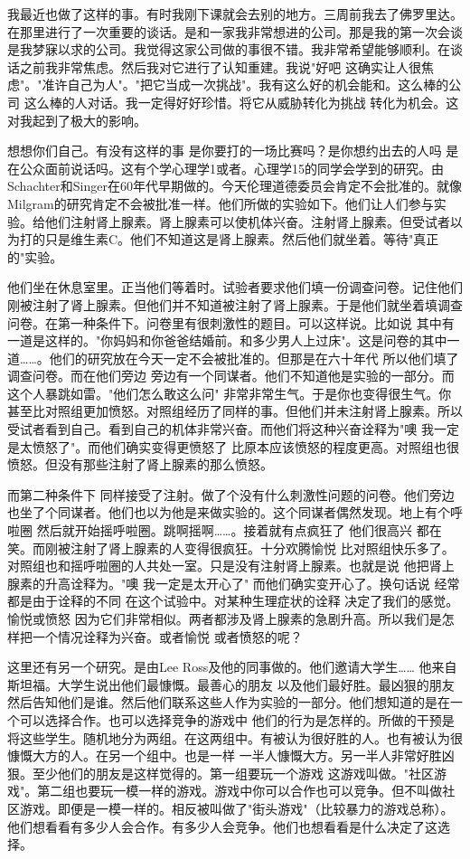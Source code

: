 我最近也做了这样的事。有时我刚下课就会去别的地方。三周前我去了佛罗里达。在那里进行了一次重要的谈话。是和一家我非常想进的公司。那是我的第一次会谈 是我梦寐以求的公司。我觉得这家公司做的事很不错。我非常希望能够顺利。在谈话之前我非常焦虑。然后我对它进行了认知重建。我说"好吧 这确实让人很焦虑"。"准许自己为人"。"把它当成一次挑战"。我有这么好的机会能和。这么棒的公司 这么棒的人对话。我一定得好好珍惜。将它从威胁转化为挑战 转化为机会。这对我起到了极大的影响。 

想想你们自己。有没有这样的事 是你要打的一场比赛吗？是你想约出去的人吗 是在公众面前说话吗。这有个学心理学1或者。心理学15的同学会学到的研究。由Schachter和Singer在60年代早期做的。今天伦理道德委员会肯定不会批准的。就像Milgram的研究肯定不会被批准一样。他们所做的实验如下。他们让人们参与实验。给他们注射肾上腺素。肾上腺素可以使机体兴奋。注射肾上腺素。但受试者以为打的只是维生素C。他们不知道这是肾上腺素。然后他们就坐着。等待"真正的"实验。 

他们坐在休息室里。正当他们等着时。试验者要求他们填一份调查问卷。记住他们刚被注射了肾上腺素。但他们并不知道被注射了肾上腺素。于是他们就坐着填调查问卷。在第一种条件下。问卷里有很刺激性的题目。可以这样说。比如说 其中有一道是这样的。"你妈妈和你爸爸结婚前。和多少男人上过床"。这是问卷的其中一道……。他们的研究放在今天一定不会被批准的。但那是在六十年代 所以他们填了调查问卷。而在他们旁边 旁边有一个同谋者。他们不知道他是实验的一部分。而这个人暴跳如雷。"他们怎么敢这么问" 非常非常生气。于是你也变得很生气。你甚至比对照组更加愤怒。对照组经历了同样的事。但他们并未注射肾上腺素。所以受试者看到自己。看到自己的机体非常兴奋。而他们将这种兴奋诠释为"噢 我一定是太愤怒了"。而他们确实变得更愤怒了 比原本应该愤怒的程度更高。对照组也很愤怒。但没有那些注射了肾上腺素的那么愤怒。 

而第二种条件下 同样接受了注射。做了个没有什么刺激性问题的问卷。他们旁边也坐了个同谋者。他们也以为他是来做实验的。这个同谋者偶然发现。地上有个呼啦圈 然后就开始摇呼啦圈。跳啊摇啊……。接着就有点疯狂了 他们很高兴 都在笑。而刚被注射了肾上腺素的人变得很疯狂。十分欢腾愉悦 比对照组快乐多了。对照组也和摇呼啦圈的人共处一室。只是没有注射肾上腺素。也就是说 他把肾上腺素的升高诠释为。"噢 我一定是太开心了" 而他们确实变开心了。换句话说 经常都是由于诠释的不同 在这个试验中。对某种生理症状的诠释 决定了我们的感觉。愉悦或愤怒 因为它们非常相似。两者都涉及肾上腺素的急剧升高。所以我们是怎样把一个情况诠释为兴奋。或者愉悦 或者愤怒的呢？ 

这里还有另一个研究。是由Lee Ross及他的同事做的。他们邀请大学生…… 他来自斯坦福。大学生说出他们最慷慨。最善心的朋友 以及他们最好胜。最凶狠的朋友 然后告知他们是谁。然后他们联系这些人作为实验的一部分。他们想知道的是在一个可以选择合作。也可以选择竞争的游戏中 他们的行为是怎样的。所做的干预是将这些学生。随机地分为两组。在这两组中。有被认为很好胜的人。也有被认为很慷慨大方的人。在另一个组中。也是一样 一半人慷慨大方。另一半人非常好胜凶狠。至少他们的朋友是这样觉得的。第一组要玩一个游戏 这游戏叫做。"社区游戏"。第二组也要玩一模一样的游戏。游戏中你可以合作也可以竞争。但不叫做社区游戏。即便是一模一样的。相反被叫做了"街头游戏"（比较暴力的游戏总称）。他们想看看有多少人会合作。有多少人会竞争。他们也想看看是什么决定了这选择。 


